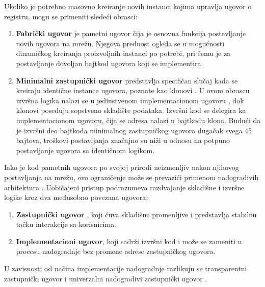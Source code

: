 Ukoliko je potrebno masovno kreiranje novih instanci kojima upravlja ugovor o registru, mogu se primeniti sledeći obrasci:
\begin{enumerate}
\item \textbf{Fabrički ugovor}  je pametni ugovor čija je osnovna funkcija postavljanje novih ugovora na mrežu. Njegova prednost ogleda se u mogućnosti dinamičkog kreiranja proizvoljnih instanci po potrebi, pri čemu je za postavljanje dovoljan bajtkod ugovora koji se implementira.

\item \textbf{Minimalni zastupnički ugovor} \cite{CLONEeip1167}  predstavlja specifičan slučaj kada se kreiraju identične instance ugovora, poznate kao klonovi . U ovom obrascu izvršna logika nalazi se u jedinstvenom implementacionom ugovoru , dok klonovi poseduju sopstveno skladište podataka. Izvršni kod se delegira ka implementacionom ugovoru, čija se adresa nalazi u bajtkodu klona. Budući da je izvršni deo bajtkoda minimalnog zastupničkog ugovora dugačak svega 45 bajtova, troškovi postavljanja značajno su niži u odnosu na potpuno postavljanje ugovora sa identičnom logikom.
\end{enumerate}

Iako je kod pametnih ugovora po svojoj prirodi neizmenljiv nakon njihovog postavljanja na mrežu, ovo ograničenje može se prevazići primenom nadogradivih arhitektura \cite{meisami2023comprehensive}. Uobičajeni pristup podrazumeva razdvajanje skladišne i izvršne logike kroz dva međusobno povezana ugovora:

\begin{enumerate}
\item \textbf{Zastupnički ugovor} \cite{PROXYeip1967}, koji čuva skladišne promenljive i predstavlja stabilnu tačku interakcije sa korisnicima.
\item \textbf{Implementacioni ugovor}, koji sadrži izvršni kod i može se zameniti u procesu nadogradnje bez promene adrese zastupničkog ugovora.
\end{enumerate}
U zavisnosti od načina implementacije nadogradnje razlikuju se transparentni zastupnički ugovor  i univerzalni nadogradivi zastupnički ugovor .

